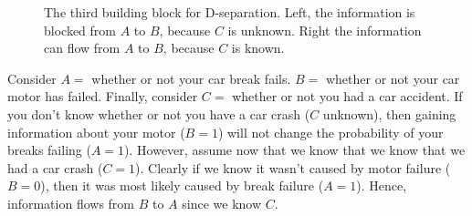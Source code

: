 \begin{figure}[h!]
\centering
\begin{minipage}{0.4\textwidth}
\end{minipage}
\begin{minipage}{0.4\textwidth}
\end{minipage}
\caption{The third building block for D-separation. 
Left, the information is blocked from $A$ to $B$, because $C$
is unknown. Right the information can flow from $A$ to $B$, 
because $C$ is known.}
\label{fig:building_block_three}
\end{figure}

\begin{exmp}
Consider $A = $ whether or not your car break fails. $B =$ whether or not
your car motor has failed. Finally, consider $C = $ whether or not
you had a car accident. If you don't know whether or not you have a 
car crash ($C$ unknown), then gaining information about your motor 
($B = 1$) will not change the probability of your breaks failing 
($A = 1$). However, assume now that we know that we know that we had
a car crash ($C = 1$). Clearly if we know it wasn't caused by motor
failure ($B = 0$), then it was most likely caused by break failure 
($A = 1$). Hence, information flows from $B$ to $A$ since we know
$C$.
\end{exmp}

